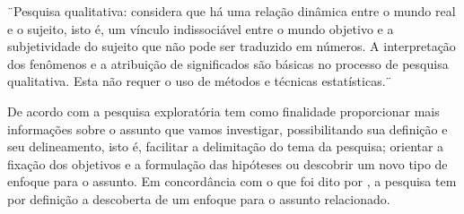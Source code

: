 \begin{sidecite}
    ¨Pesquisa qualitativa: considera que há uma relação dinâmica
    entre o mundo real e o sujeito, isto é, um vínculo indissociável
    entre o mundo objetivo e a subjetividade do sujeito que não pode
    ser traduzido em números.
    A interpretação dos fenômenos e a atribuição de significados são
    básicas no processo de pesquisa qualitativa.
    Esta não requer o uso de métodos e técnicas estatísticas.¨\cite[p.~70]{prodanov2013}
\end{sidecite}

De acordo com \textcite{prodanov2013} a pesquisa exploratória tem
como finalidade proporcionar mais informações sobre o assunto que
vamos investigar, possibilitando sua definição e seu delineamento,
isto é, facilitar a delimitação do tema da pesquisa; orientar a
fixação dos objetivos e a formulação das hipóteses ou descobrir um
novo tipo de enfoque para o assunto.
Em concordância com o que foi dito por \textcite{prodanov2013}, a
pesquisa tem por definição a descoberta de um enfoque para o assunto
relacionado.

